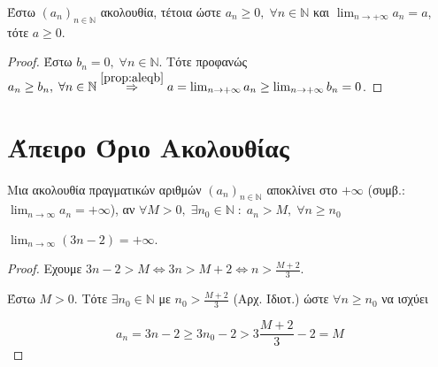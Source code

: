 \begin{cor}
  Έστω $ (a_{n})_{n \in \mathbb{N}} $ ακολουθία, τέτοια ώστε 
  $ a_{n} \geq 0, \; \forall n \in \mathbb{N} $ και 
  $ \lim_{n \to +\infty} a_{n} = a$, τότε $ a \geq 0 $.
\end{cor}
\begin{proof}
  Έστω $ b_{n} = 0, \; \forall n \in \mathbb{N} $. Τότε προφανώς 
  $ a_{n} \geq b_{n}, \; \forall n
  \in \mathbb{N} \overset{\ref{prop:aleqb}}{\Rightarrow} 
  a = \lim_{n \to +\infty} a_{n} \geq \lim_{n \to +\infty} b_{n} = 0$.
\end{proof}


\section{Άπειρο Όριο Ακολουθίας}

\begin{mybox1}
  \begin{dfn}
    Μια ακολουθία πραγματικών αριθμών $ (a_{n})_{n \in \mathbb{N}} $ 
    \textcolor{Col1}{αποκλίνει} στο $ +\infty $ (συμβ.: 
    $ \lim_{n \to \infty} a_{n} = + 
    \infty $), αν $ \forall M>0, \; \exists n_{0} \in 
    \mathbb{N} \; : \; a_{n} > M, \; \forall n \geq n_{0}$
  \end{dfn}
\end{mybox1}

\begin{example}
  $ \lim_{n \to \infty} (3n-2)=+\infty $. 
\end{example}
\begin{proof}
  \item {}

    Εχουμε $ 3n-2>M \Leftrightarrow 3n >M+2 \Leftrightarrow n > \frac{M+2}{3} $.

    Έστω $ M > 0 $. Τότε $ \exists n_{0} \in \mathbb{N} $ με $ n_{0}> \frac{M+2}{3} $
    (Αρχ. Ιδιοτ.) ώστε $ \forall n \geq n_{0} $ να ισχύει 


   \[
     a_{n}= 3n-2 \geq 3 n_{0}-2 > 3 \frac{M+2}{3} - 2 = M 
    \]


\end{proof}

